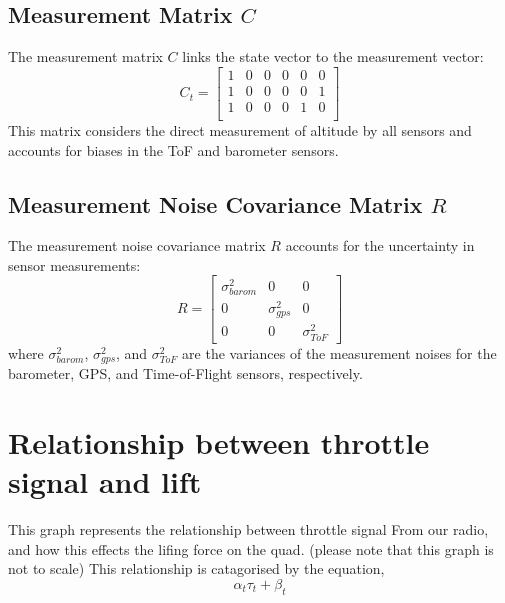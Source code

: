 \documentclass{article}
\begin{document}
\subsection{Measurement Matrix \( C \)}
The measurement matrix \( C \) links the state vector to the measurement vector:
\begin{equation}
C_t = 
\begin{bmatrix}
1 & 0 & 0 & 0 & 0 & 0 \\
1 & 0 & 0 & 0 & 0 & 1 \\
1 & 0 & 0 & 0 & 1 & 0 \\
\end{bmatrix}
\end{equation}
This matrix considers the direct measurement of altitude by all sensors and accounts for biases in the ToF and barometer sensors.

\subsection{Measurement Noise Covariance Matrix \( R \)}
The measurement noise covariance matrix \( R \) accounts for the uncertainty in sensor measurements:
\begin{equation}
R = 
\begin{bmatrix}
\sigma_{barom}^2 & 0 & 0 \\
0 & \sigma_{gps}^2 & 0 \\
0 & 0 & \sigma_{ToF}^2
\end{bmatrix}
\end{equation}
where \( \sigma_{barom}^2 \), \( \sigma_{gps}^2 \), and \( \sigma_{ToF}^2 \) are the variances of the measurement noises for the barometer, GPS, and Time-of-Flight sensors, respectively.

\section{Relationship between throttle signal and lift}
\begin{figure}[H]
    \centering
    \label{fig:fig1}
    \caption{}
\end{figure}
This graph represents the relationship between throttle signal 
From our radio, and how this effects the lifing force on the quad.
(please note that this graph is not to scale)
This relationship is catagorised by the equation, 
\[
\alpha_t\tau_t + \beta_t
\]
\end{document}
